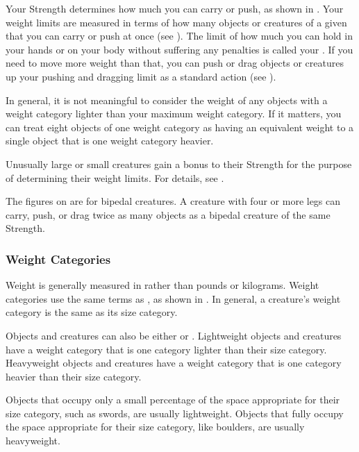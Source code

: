     Your Strength determines how much you can carry or push, as shown in .
    Your weight limits are measured in terms of how many objects or creatures of a given  that you can carry or push at once (see ).
    The limit of how much you can hold in your hands or on your body without suffering any penalties is called your .
    If you need to move more weight than that, you can push or drag objects or creatures up your pushing and dragging limit as a standard action (see ).

    In general, it is not meaningful to consider the weight of any objects with a weight category lighter than your maximum weight category.
    If it matters, you can treat eight objects of one weight category as having an equivalent weight to a single object that is one weight category heavier.

     Unusually large or small creatures gain a bonus to their Strength for the purpose of determining their weight limits.
    For details, see .

     The figures on  are for bipedal creatures.
    A creature with four or more legs can carry, push, or drag twice as many objects as a bipedal creature of the same Strength.

    \subsubsection{Weight Categories}\label{Weight Categories}
      Weight is generally measured in  rather than pounds or kilograms.
      Weight categories use the same terms as , as shown in .
      In general, a creature's weight category is the same as its size category.

      Objects and creatures can also be either  or .
      Lightweight objects and creatures have a weight category that is one category lighter than their size category.
      Heavyweight objects and creatures have a weight category that is one category heavier than their size category.

      Objects that occupy only a small percentage of the space appropriate for their size category, such as swords, are usually lightweight.
      Objects that fully occupy the space appropriate for their size category, like boulders, are usually heavyweight.

